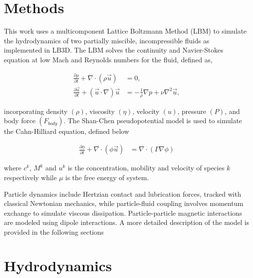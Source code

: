 \section{Methods} \label{section:methods}

This work uses a multicomponent Lattice Boltzmann Method (LBM) to simulate the hydrodynamics of two partially miscible, 
incompressible fluids as implemented in LB3D. The LBM solves the continuity and Navier-Stokes equation at low
Mach and Reynolds numbers for the fluid, defined as, 

\begin{equation}
    \begin{split}
    \frac{\partial\rho}{\partial t} + \nabla\cdot\left(\rho\vec{u}\right) &= 0 , \\
    \frac{\partial\vec{u}}{\partial t} + (\vec{u}\cdot\nabla)\vec{u} &= - \frac{1}{\rho} \nabla p + \nu \nabla^2 \vec{u} ,
    \end{split}
\end{equation}

incorporating density $(\rho)$, viscosity $(\eta)$, velocity $(u)$, pressure $(P)$, and 
body force $(F_{body})$. \cite{qian_lattice_1992, chin_lattice_2002, nourgaliev_lattice_2003} The Shan-Chen pseudopotential
model is used to simulate the Cahn-Hilliard equation, defined below

\begin{equation}
    \begin{split}
    \frac{\partial\phi}{\partial t}+\nabla\cdot\left(\phi\vec{u}\right) &= \nabla \cdot \left( \Gamma  \nabla\phi \right)
    \end{split}
\end{equation}

where $c^k$, $M^k$ and $u^k$ is the concentration, mobility and velocity of species $k$ respectively while $\mu$ is the free energy of system. 
\cite{shan_lattice_1993, shan_simulation_1994, he_lattice_1997, he_discrete_1998}

Particle dynamics include Hertzian contact and lubrication forces, tracked with classical Newtonian mechanics, while 
particle-fluid coupling involves momentum exchange to simulate viscous dissipation. Particle-particle magnetic interactions are modeled using dipole 
interactions. \cite{davies_interface_2014, xie_direct_2017, xie_controllable_2021} A more detailed description of the model is 
provided in the following sections

\section{Hydrodynamics} 
\label{section:lbm_hydrodynamics}

